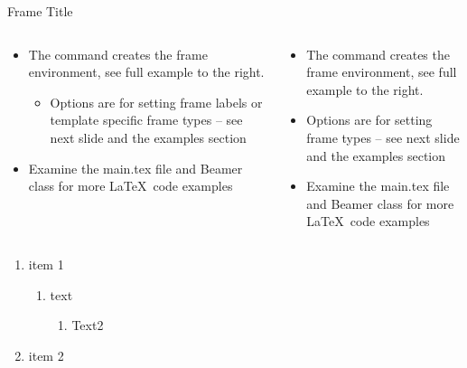 \documentclass[notheorems, aspectratio=169]{beamer}
\begin{document}
\begin{frame}{Frame Title}
\begin{columns}
\begin{column}{0.5\textwidth}
\begin{itemize}
\item The command creates the frame environment, see full example to the right.
\begin{itemize}
\item Options are for setting frame labels or template specific frame types -- see next slide and the examples section
\end{itemize}
\item Examine the main.tex file and Beamer class for more \LaTeX\ code examples
\end{itemize}
\end{column}
\begin{column}{0.5\textwidth}
\begin{itemize}
\item The command creates the frame environment, see full example to the right.
\item Options are for setting  frame types -- see next slide and \cite{b2} the examples section 
\item Examine the main.tex file and Beamer class for more \LaTeX\ code examples
\end{itemize}
\end{column}
\end{columns}
\vspace{1em}

\begin{enumerate}
\item item 1
\begin{enumerate}
\item text
\begin{enumerate}
\item Text2
\end{enumerate}
\end{enumerate}
\item item 2
\end{enumerate}
\end{frame}
\end{document}
